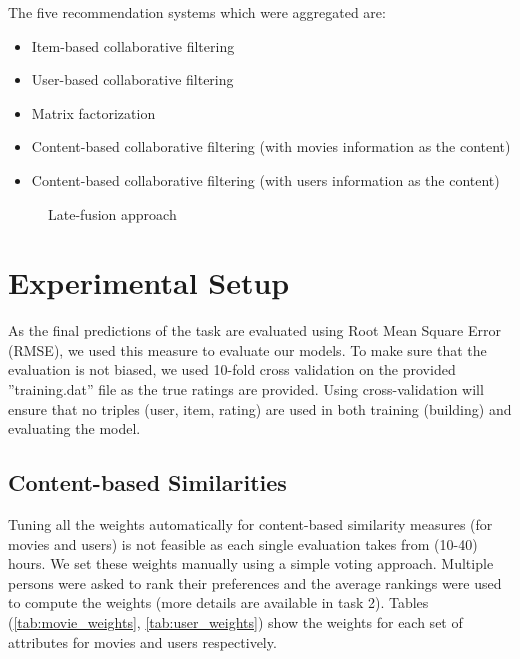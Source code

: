 \documentclass{sigish}
\begin{document}
The five recommendation systems which were aggregated are:
\begin{itemize}
	\item Item-based collaborative filtering
	\item User-based collaborative filtering
	\item Matrix factorization
	\item Content-based collaborative filtering (with movies information as the content)
	\item Content-based collaborative filtering (with users information as the content)
\end{itemize}

\begin{figure}
	\centering
	\caption{Late-fusion approach}
	\label{fig:late_fusion_approach}
\end{figure}

\section{Experimental Setup}

As the final predictions of the task are evaluated using Root Mean Square Error (RMSE), we used this measure to evaluate our models. To make sure that the evaluation is not biased, we used 10-fold cross validation on the provided ''training.dat'' file as the true ratings are provided. Using cross-validation will ensure that no triples (user, item, rating) are used in both training (building) and evaluating the model.

\subsection{Content-based Similarities}
Tuning all the weights automatically for content-based similarity measures (for movies and users) is not feasible as each single evaluation takes from (10-40) hours. We set these weights manually using a simple voting approach. Multiple persons were asked to rank their preferences and the average rankings were used to compute the weights (more details are available in task 2). Tables (\ref{tab:movie_weights}, \ref{tab:user_weights}) show the weights for each set of attributes for movies and users respectively.
\end{document}
